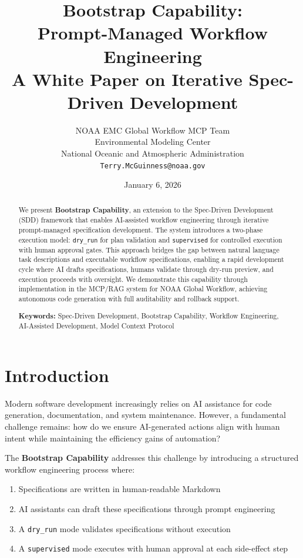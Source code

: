 \documentclass[11pt,letterpaper]{article}
\title{\textbf{Bootstrap Capability:} \\
       \textbf{Prompt-Managed Workflow Engineering} \\[0.5em]
       \large A White Paper on Iterative Spec-Driven Development}
\author{
    NOAA EMC Global Workflow MCP Team \\
    Environmental Modeling Center \\
    National Oceanic and Atmospheric Administration \\
    \texttt{Terry.McGuinness@noaa.gov}
}
\date{January 6, 2026}
\begin{document}
\maketitle

\begin{abstract}
We present \textbf{Bootstrap Capability}, an extension to the Spec-Driven Development (SDD) framework that enables AI-assisted workflow engineering through iterative prompt-managed specification development. The system introduces a two-phase execution model: \texttt{dry\_run} for plan validation and \texttt{supervised} for controlled execution with human approval gates. This approach bridges the gap between natural language task descriptions and executable workflow specifications, enabling a rapid development cycle where AI drafts specifications, humans validate through dry-run preview, and execution proceeds with oversight. We demonstrate this capability through implementation in the MCP/RAG system for NOAA Global Workflow, achieving autonomous code generation with full auditability and rollback support.

\textbf{Keywords:} Spec-Driven Development, Bootstrap Capability, Workflow Engineering, AI-Assisted Development, Model Context Protocol
\end{abstract}

\section{Introduction}

Modern software development increasingly relies on AI assistance for code generation, documentation, and system maintenance. However, a fundamental challenge remains: how do we ensure AI-generated actions align with human intent while maintaining the efficiency gains of automation?

The \textbf{Bootstrap Capability} addresses this challenge by introducing a structured workflow engineering process where:

\begin{enumerate}
    \item Specifications are written in human-readable Markdown
    \item AI assistants can draft these specifications through prompt engineering
    \item A \texttt{dry\_run} mode validates specifications without execution
    \item A \texttt{supervised} mode executes with human approval at each side-effect step
\end{enumerate}
\end{document}
